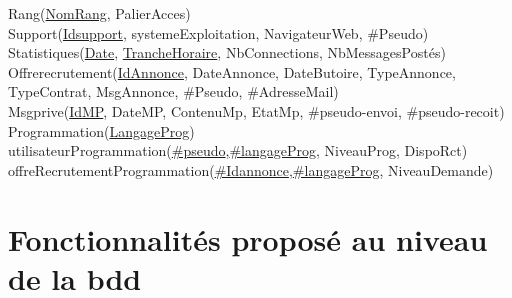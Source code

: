 \documentclass{report}
\begin{document}
Rang(\underline{NomRang}, PalierAcces)\\

Support(\underline{Idsupport}, systemeExploitation, NavigateurWeb, \#Pseudo)\\

Statistiques(\underline{Date}, \underline{TrancheHoraire}, NbConnections, NbMessagesPostés)\\


Offrerecrutement(\underline{IdAnnonce}, DateAnnonce, DateButoire, TypeAnnonce, TypeContrat, MsgAnnonce, \#Pseudo, \#AdresseMail)\\

Msgprive(\underline{IdMP}, DateMP, ContenuMp, EtatMp, \#pseudo-envoi, \#pseudo-recoit)\\

Programmation(\underline{LangageProg})\\

utilisateurProgrammation(\underline{\#pseudo},\underline{\#langageProg}, NiveauProg, DispoRct)\\

offreRecrutementProgrammation(\underline{\#Idannonce},\underline{\#langageProg}, NiveauDemande)\\

\chapter{Fonctionnalités proposé au niveau de la bdd}
\end{document}
